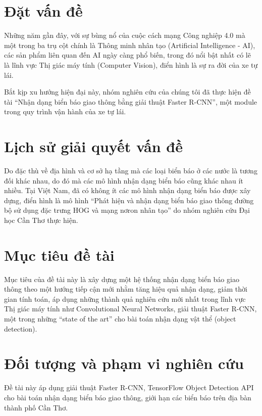 \documentclass[../thesis.tex]{subfiles}
\begin{document}
\section{Đặt vấn đề}

Những năm gần đây, với sự bùng nổ của cuộc cách mạng Công nghiệp 4.0 mà một trong ba trụ cột chính là Thông minh nhân tạo (Artificial Intelligence - AI), các sản phẩm liên quan đến AI ngày càng phổ biến, trong đó nổi bật nhất có lẽ là lĩnh vực Thị giác máy tính (Computer Vision), điển hình là sự ra đời của xe tự lái. 

Bắt kịp xu hướng hiện đại này, nhóm nghiên cứu của chúng tôi đã thực hiện đề tài ``Nhận dạng biển báo giao thông bằng giải thuật Faster R-CNN'', một module trong quy trình vận hành của xe tự lái.

\section{Lịch sử giải quyết vấn đề}

Do đặc thù về địa hình và cơ sở hạ tầng mà các loại biển báo ở các nước là tương đối khác nhau, do đó mà các mô hình nhận dạng biển báo cũng khác nhau ít nhiều. Tại Việt Nam, đã có không ít các mô hình nhận dạng biển báo được xây dựng, điển hình là mô hình ``Phát hiện và nhận dạng biển báo giao thông đường bộ sử dụng đặc trưng HOG và mạng nơron nhân tạo'' do nhóm nghiên cứu Đại học Cần Thơ thực hiện.

\section{Mục tiêu đề tài}

Mục tiêu của đề tài này là xây dựng một hệ thống nhận dạng biển báo giao thông theo một hướng tiếp cận mới nhằm tăng hiệu quả nhận dạng, giảm thời gian tính toán, áp dụng những thành quả nghiên cứu mới nhất trong lĩnh vực Thị giác máy tính như Convolutional Neural Networks, giải thuật Faster R-CNN, một trong những ``state of the art'' cho bài toán nhận dạng vật thể (object detection).

\section{Đối tượng và phạm vi nghiên cứu}

Đề tài này áp dụng giải thuật Faster R-CNN, TensorFlow Object Detection API cho bài toán nhận dạng biển báo giao thông, giới hạn các biển báo trên địa bàn thành phố Cần Thơ. 
\end{document}
